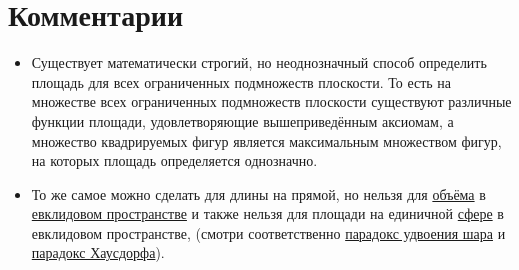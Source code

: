 \documentclass[a4paper,8pt,leqno]{article}
\theoremstyle{plain}
\theoremstyle{definition} %
\theoremstyle{remark} %
\begin{document}
\section{Комментарии}
\begin{itemize}
\item Существует математически строгий, но неоднозначный способ определить площадь для всех ограниченных подмножеств плоскости. То есть на множестве всех ограниченных подмножеств плоскости существуют различные функции площади, удовлетворяющие вышеприведённым аксиомам, а множество квадрируемых фигур является максимальным множеством фигур, на которых площадь определяется однозначно.
\item \begin{itemize}
	То же самое можно сделать для длины на прямой, но нельзя для \href{https://ru.wikipedia.org/wiki/\%D0\%9E\%D0\%B1\%D1\%8A\%D1\%91\%D0\%BC\_(\%D0\%B3\%D0\%B5\%D0\%BE\%D0\%BC\%D0\%B5\%D1\%82\%D1\%80\%D0\%B8\%D1\%8F)}{объёма} в \href{https://ru.wikipedia.org/wiki/\%D0\%95\%D0\%B2\%D0\%BA\%D0\%BB\%D0\%B8\%D0\%B4\%D0\%BE\%D0\%B2\%D0\%BE\_\%D0\%BF\%D1\%80\%D0\%BE\%D1\%81\%D1\%82\%D1\%80\%D0\%B0\%D0\%BD\%D1\%81\%D1\%82\%D0\%B2\%D0\%BE}{евклидовом пространстве} и также нельзя для площади на единичной \href{https://ru.wikipedia.org/wiki/\%D0\%A1\%D1\%84\%D0\%B5\%D1\%80\%D0\%B0\_(\%D0\%BF\%D0\%BE\%D0\%B2\%D0\%B5\%D1\%80\%D1\%85\%D0\%BD\%D0\%BE\%D1\%81\%D1\%82\%D1\%8C)}{сфере} в евклидовом пространстве, (смотри соответственно \href{https://ru.wikipedia.org/wiki/\%D0\%9F\%D0\%B0\%D1\%80\%D0\%B0\%D0\%B4\%D0\%BE\%D0\%BA\%D1\%81\_\%D1\%83\%D0\%B4\%D0\%B2\%D0\%BE\%D0\%B5\%D0\%BD\%D0\%B8\%D1\%8F\_\%D1\%88\%D0\%B0\%D1\%80\%D0\%B0}{парадокс удвоения шара} и \href{https://ru.wikipedia.org/wiki/\%D0\%9F\%D0\%B0\%D1\%80\%D0\%B0\%D0\%B4\%D0\%BE\%D0\%BA\%D1\%81\_\%D0\%A5\%D0\%B0\%D1\%83\%D1\%81\%D0\%B4\%D0\%BE\%D1\%80\%D1\%84\%D0\%B0}{парадокс Хаусдорфа}).
\end{itemize}
\end{itemize}
\end{document}
